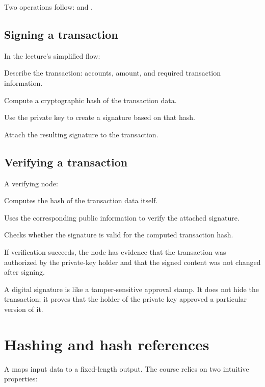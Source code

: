 Two operations follow:  and .

\subsection{Signing a transaction}

In the lecture's simplified flow:

\begin{mlsteps}
  \item Describe the transaction: accounts, amount, and required transaction information.
  \item Compute a cryptographic hash of the transaction data.
  \item Use the private key to create a signature based on that hash.
  \item Attach the resulting signature to the transaction.
\end{mlsteps}

\subsection{Verifying a transaction}

A verifying node:

\begin{mlsteps}
  \item Computes the hash of the transaction data itself.
  \item Uses the corresponding public information to verify the attached signature.
  \item Checks whether the signature is valid for the computed transaction hash.
\end{mlsteps}

If verification succeeds, the node has evidence that the transaction was authorized by the private-key holder and that the signed content was not changed after signing.

\begin{intuition}
A digital signature is like a tamper-sensitive approval stamp. It does not hide the transaction; it proves that the holder of the private key approved a particular version of it.
\end{intuition}

\section{Hashing and hash references}

A  maps input data to a fixed-length output. The course relies on two intuitive properties:

